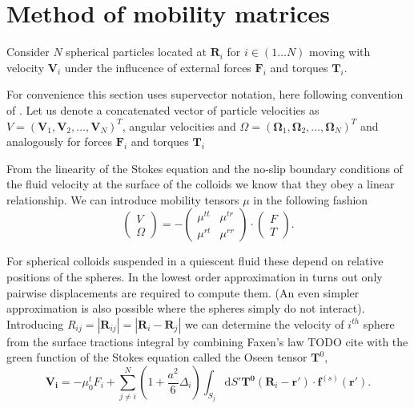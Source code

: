 \documentclass{doctoral}
\newcommand{\dd}{\mathrm{d}}
\begin{document}
\section{Method of mobility matrices}


Consider $N$ spherical particles located at $\bm{R}_i$ for $i \in (1 \dots N)$ moving with velocity $\bm{V}_i$ under the influcence of external forces $\bm{F}_i$ and torques $\bm{T}_i$.

For convenience this section uses supervector notation, here following convention of \cite{Nagele_2013}.
Let us denote a concatenated vector of particle velocities as $V = (\bm{V}_1,\bm{V}_2,\dots,\bm{V}_N)^{T}$, angular velocities and $\Omega = (\bm{\Omega}_1,\bm{\Omega}_2,\dots,\bm{\Omega}_N)^{T}$ and analogously for forces $\bm{F}_i$ and torques $\bm{T}_i$ 

From the linearity of the Stokes equation and the no-slip boundary conditions of the fluid velocity at the surface of the colloids we know that they obey a linear relationship.
We can introduce mobility tensors $\mu$ in the following fashion
\begin{equation}
    \begin{pmatrix}
        V \\
        \Omega
    \end{pmatrix}
    = -
    \begin{pmatrix}
        \mu^{tt} & \mu^{tr} \\
        \mu^{rt} & \mu^{rr}
    \end{pmatrix}
    \cdot
    \begin{pmatrix}
        F \\
        T
    \end{pmatrix}
    .
    \label{eqn:mobility-matrix-definition}
\end{equation}

For spherical colloids suspended in a quiescent fluid these depend on relative positions of the spheres.
In the lowest order approximation in turns out only pairwise displacements are required to compute them.
(An even simpler approximation is also possible where the spheres simply do not interact).
Introducing $R_{ij} = |\bm{R}_{ij}| = |\bm{R}_i - \bm{R}_j|$ we can determine the velocity of $i^{th}$ sphere from the surface tractions integral by combining Faxen's law TODO cite with the green function of the Stokes equation called the Oseen tensor $\bm{T}^0$,
\begin{equation}
    \bm{V_i} = -\mu_0^t F_i + \sum_{j\neq i}^N (1 + \frac{a^2}{6} \Delta_i) \int_{S_j} \dd S' \bm{T^0}(\bm{R}_i-\bm{r'})\cdot \bm{f}^{(s)}(\bm{r'}).
    \label{eqn:faxen-theorem}
\end{equation}
\end{document}
